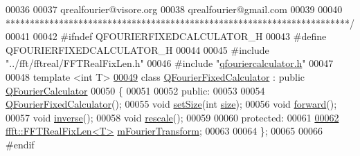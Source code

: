 \begin{DoxyCode}
00036 \textcolor{comment}{}
00037 \textcolor{comment}{qrealfourier@visore.org}
00038 \textcolor{comment}{qrealfourier@gmail.com}
00039 \textcolor{comment}{}
00040 \textcolor{comment}{***********************************************************************/}
00041 
00042 \textcolor{preprocessor}{#ifndef QFOURIERFIXEDCALCULATOR\_H}
00043 \textcolor{preprocessor}{#define QFOURIERFIXEDCALCULATOR\_H}
00044 
00045 \textcolor{preprocessor}{#include "../fft/fftreal/FFTRealFixLen.h"}
00046 \textcolor{preprocessor}{#include "\hyperlink{a00118}{qfouriercalculator.h}"}
00047 
00048 \textcolor{keyword}{template} <\textcolor{keywordtype}{int} T>
\hypertarget{a00120_source_l00049}{}\hyperlink{a00053}{00049} \textcolor{keyword}{class }\hyperlink{a00053}{QFourierFixedCalculator} : \textcolor{keyword}{public} \hyperlink{a00052}{QFourierCalculator}
00050 \{
00051 
00052     \textcolor{keyword}{public}:
00053         
00054         \hyperlink{a00053_afec2fb9cec17894ef678ddd2b8ff06b2}{QFourierFixedCalculator}();
00055         \textcolor{keywordtype}{void} \hyperlink{a00053_a70226b30fca6e342f2b14e61d75a5f23}{setSize}(\textcolor{keywordtype}{int} \hyperlink{a00052_a76f0e0b1b3269d7267cd732b3e6ba3a5}{size});
00056         \textcolor{keywordtype}{void} \hyperlink{a00053_adb47db1084fbdaccf260b6e490ed116f}{forward}();
00057         \textcolor{keywordtype}{void} \hyperlink{a00053_abdb573e6145140de2e5b96ba155fd86d}{inverse}();
00058         \textcolor{keywordtype}{void} \hyperlink{a00053_a28f08b0466a5fe5ad7b7b0fe591e9544}{rescale}();
00059 
00060     \textcolor{keyword}{protected}:
00061 
\hypertarget{a00120_source_l00062}{}\hyperlink{a00053_a019d8a4e7bf2b844d28891d0f7d2172d}{00062}         \hyperlink{a00011}{ffft::FFTRealFixLen<T>} \hyperlink{a00053_a019d8a4e7bf2b844d28891d0f7d2172d}{mFourierTransform};
00063 
00064 \};
00065 
00066 \textcolor{preprocessor}{#endif}
\end{DoxyCode}
